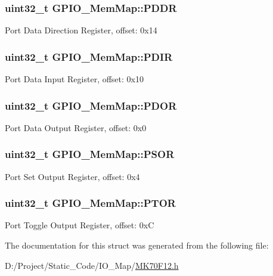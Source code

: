 \subsubsection[{P\+D\+D\+R}]{\setlength{\rightskip}{0pt plus 5cm}uint32\+\_\+t G\+P\+I\+O\+\_\+\+Mem\+Map\+::\+P\+D\+D\+R}\label{struct_g_p_i_o___mem_map_a49dfaa95d08fa9178dd7f098c87f562d}
Port Data Direction Register, offset\+: 0x14 \hypertarget{struct_g_p_i_o___mem_map_a01933bea5d005bf126ea2e0345518763}{}
\subsubsection[{P\+D\+I\+R}]{\setlength{\rightskip}{0pt plus 5cm}uint32\+\_\+t G\+P\+I\+O\+\_\+\+Mem\+Map\+::\+P\+D\+I\+R}\label{struct_g_p_i_o___mem_map_a01933bea5d005bf126ea2e0345518763}
Port Data Input Register, offset\+: 0x10 \hypertarget{struct_g_p_i_o___mem_map_aaf4f486952b9b4680e270ce6266122fd}{}
\subsubsection[{P\+D\+O\+R}]{\setlength{\rightskip}{0pt plus 5cm}uint32\+\_\+t G\+P\+I\+O\+\_\+\+Mem\+Map\+::\+P\+D\+O\+R}\label{struct_g_p_i_o___mem_map_aaf4f486952b9b4680e270ce6266122fd}
Port Data Output Register, offset\+: 0x0 \hypertarget{struct_g_p_i_o___mem_map_a14833f065ec123137ccce5ab873b5879}{}
\subsubsection[{P\+S\+O\+R}]{\setlength{\rightskip}{0pt plus 5cm}uint32\+\_\+t G\+P\+I\+O\+\_\+\+Mem\+Map\+::\+P\+S\+O\+R}\label{struct_g_p_i_o___mem_map_a14833f065ec123137ccce5ab873b5879}
Port Set Output Register, offset\+: 0x4 \hypertarget{struct_g_p_i_o___mem_map_a03faa882b5f4554ff4c11954c2d8759b}{}
\subsubsection[{P\+T\+O\+R}]{\setlength{\rightskip}{0pt plus 5cm}uint32\+\_\+t G\+P\+I\+O\+\_\+\+Mem\+Map\+::\+P\+T\+O\+R}\label{struct_g_p_i_o___mem_map_a03faa882b5f4554ff4c11954c2d8759b}
Port Toggle Output Register, offset\+: 0x\+C 

The documentation for this struct was generated from the following file\+:\begin{DoxyCompactItemize}
\item 
D\+:/\+Project/\+Static\+\_\+\+Code/\+I\+O\+\_\+\+Map/\hyperlink{_m_k70_f12_8h}{M\+K70\+F12.\+h}\end{DoxyCompactItemize}
